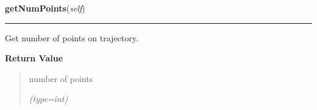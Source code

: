     \label{gblfit:GblTrajectory:getNumPoints}

    \vspace{0.5ex}

\hspace{.8\funcindent}\begin{boxedminipage}{\funcwidth}

    \raggedright \textbf{getNumPoints}(\textit{self})

    \vspace{-1.5ex}

    \rule{\textwidth}{0.5\fboxrule}
\setlength{\parskip}{2ex}
    Get number of points on trajectory.

\setlength{\parskip}{1ex}
      \textbf{Return Value}
    \vspace{-1ex}

      \begin{quote}
      number of points

      {\it (type=int)}

      \end{quote}

    \end{boxedminipage}

    \label{gblfit:GblTrajectory:addExternalSeed}

    \vspace{0.5ex}

